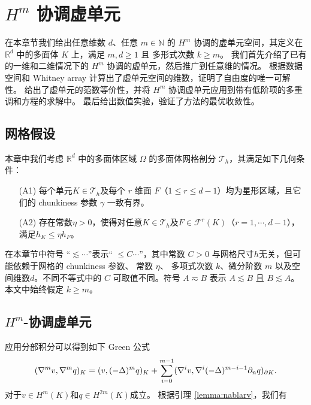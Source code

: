 \chapter{$H^m$ 协调虚单元}

在本章节我们给出任意维数 $d$、任意 $m \in \mathbb{N}$ 的
$H^m$ 协调的虚单元空间，其定义在 $\mathbb R^d$ 中的多面体 $K$
上，满足 $m, d\geq 1$ 且 多形式次数 $k\geq m$。
我们首先介绍了已有的一维和二维情况下的 $H^m$
协调的虚单元，然后推广到任意维的情况。
根据数据空间和 Whitney array 计算出了虚单元空间的维数，证明了自由度的唯一可解性。
给出了虚单元的范数等价性，并将 $H^m$ 
协调虚单元应用到带有低阶项的多重调和方程的求解中。
最后给出数值实验，验证了方法的最优收敛性。

\section{网格假设}
本章中我们考虑 $\mathbb{R}^d$ 中的多面体区域 $\Omega$ 的多面体网格剖分 $\mathcal
T_h$，其满足如下几何条件：
\begin{itemize}
 \item[(A1)] 每个单元$K\in \mathcal T_h$及每个 $r$ 维面 $F$（$1\leq r\leq
     d-1$）均为星形区域，且它们的 chunkiness 参数 $\gamma$ 一致有界。

 \item[(A2)] 存在常数$\eta>0$，使得对任意$K\in \mathcal T_h$及$F\in\mathcal
     F^r(K)$（$r=1,\cdots, d-1$），满足$h_K\leq\eta h_F$。
\end{itemize}

在本章节中符号 “$\lesssim\cdots$”表示“ $\leq
C\cdots$”，其中常数 $C>0$ 与网格尺寸$h$无关，但可能依赖于网格的 chunkiness 参数、
常数 $\eta$、
多项式次数 $k$、微分阶数 $m$ 以及空间维数$d$。不同不等式中的 $C$ 可取值不同。符号 
$A\eqsim B$ 表示 $A\lesssim B$ 且 $B\lesssim A$。本文中始终假定 $k\geq m$。

\section{$H^m$-协调虚单元}\label{sec:vem}
应用分部积分可以得到如下 Green 公式
\begin{equation}\label{eq:greenidentity}
(\nabla^mv, \nabla^mq)_K=(v, (-\Delta)^mq)_K+\sum_{i=0}^{m-1}(\nabla^{i}v,
\nabla^{i}(-\Delta)^{m-i-1}\partial_{n}q)_{\partial K}.
\end{equation}
对于$v\in H^m(K)$和$q\in H^{2m}(K)$成立。
根据引理 \ref{lemma:nablarv}，我们有

